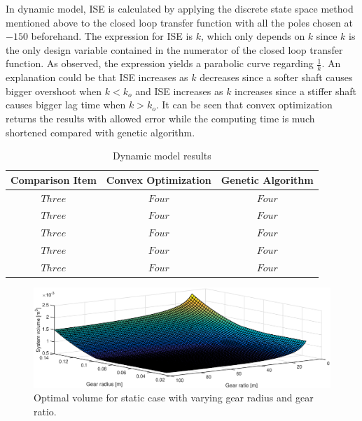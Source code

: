 In dynamic model, ISE is calculated by applying the discrete state space method mentioned above to the closed loop transfer function with all the poles chosen at $-150$ beforehand. The expression for ISE is $k$, which only depends on $k$ since $k$ is the only design variable contained in the numerator of the closed loop transfer function. As observed, the expression yields a parabolic curve regarding $\frac{1}{k}$. An explanation could be that ISE increases as $k$ decreases since a softer shaft causes bigger overshoot when $k<k_o$ and ISE increases as $k$ increases since a stiffer shaft causes bigger lag time when $k>k_o$.
It can be seen that convex optimization returns the results with allowed error while the computing time is much shortened compared with genetic algorithm. 
\begin{table}[h]
\caption{Dynamic model results}
\label{dyn}
\begin{center}
\begin{tabular}{|c||c||c|}
\hline
Comparison Item & Convex Optimization & Genetic Algorithm\\
\hline
$Three$ & $Four$ & $Four$\\
\hline
$Three$ & $Four$ & $Four$\\
\hline
$Three$ & $Four$ & $Four$\\
\hline
$Three$ & $Four$ & $Four$\\
\hline
$Three$ & $Four$ & $Four$\\
\hline
\end{tabular}
\end{center}
\end{table}

\begin{figure}[t]
  \begin{center}
    \includegraphics[width=\linewidth]{Plots/3Dplot_convex_static_mediumQ.eps}
  \end{center}
  \caption{Optimal volume for static case with varying gear radius and gear ratio.}
  \label{fig:static3D}
\end{figure}


